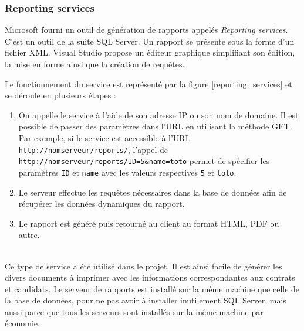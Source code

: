 
\subsubsection{Reporting services}

Microsoft fourni un outil de génération de rapports appelés \textit{Reporting services}. C'est un outil de la suite SQL Server. Un rapport se présente sous la forme d'un fichier XML. Visual Studio propose un éditeur graphique simplifiant son édition, la mise en forme ainsi que la création de requêtes.

Le fonctionnement du service est représenté par la figure \ref{reporting_services} et se déroule en plusieurs étapes :
\begin{enumerate}
	\item On appelle le service à l'aide de son adresse IP ou son nom de domaine. Il est possible de passer des paramètres dans l'URL en utilisant la méthode GET. Par exemple, si le service est accessible à l'URL \lstinline{http://nomserveur/reports/}, l'appel de \lstinline{http://nomserveur/reports/ID=5&name=toto} permet de spécifier les paramètres \lstinline{ID} et \lstinline{name} avec les valeurs respectives \lstinline{5} et \lstinline{toto}.
	\item Le serveur effectue les requêtes nécessaires dans la base de données afin de récupérer les données dynamiques du rapport.
	\item Le rapport est généré puis retourné au client au format HTML, PDF ou autre.
\end{enumerate}
~~\\

Ce type de service a été utilisé dans le projet. Il est ainsi facile de générer les divers documents à imprimer avec les informations correspondantes aux contrats et candidats. Le serveur de rapports est installé sur la même machine que celle de la base de données, pour ne pas avoir à installer inutilement SQL Server, mais aussi parce que tous les serveurs sont installés sur la même machine par économie.


